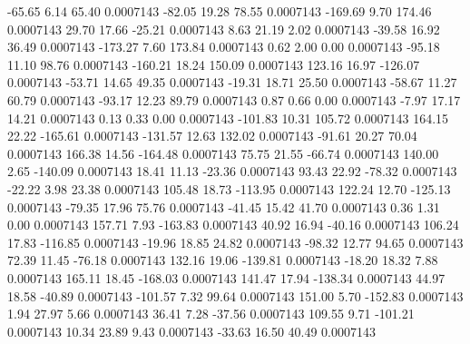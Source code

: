       -65.65        6.14       65.40     0.0007143
      -82.05       19.28       78.55     0.0007143
     -169.69        9.70      174.46     0.0007143
       29.70       17.66      -25.21     0.0007143
        8.63       21.19        2.02     0.0007143
      -39.58       16.92       36.49     0.0007143
     -173.27        7.60      173.84     0.0007143
        0.62        2.00        0.00     0.0007143
      -95.18       11.10       98.76     0.0007143
     -160.21       18.24      150.09     0.0007143
      123.16       16.97     -126.07     0.0007143
      -53.71       14.65       49.35     0.0007143
      -19.31       18.71       25.50     0.0007143
      -58.67       11.27       60.79     0.0007143
      -93.17       12.23       89.79     0.0007143
        0.87        0.66        0.00     0.0007143
       -7.97       17.17       14.21     0.0007143
        0.13        0.33        0.00     0.0007143
     -101.83       10.31      105.72     0.0007143
      164.15       22.22     -165.61     0.0007143
     -131.57       12.63      132.02     0.0007143
      -91.61       20.27       70.04     0.0007143
      166.38       14.56     -164.48     0.0007143
       75.75       21.55      -66.74     0.0007143
      140.00        2.65     -140.09     0.0007143
       18.41       11.13      -23.36     0.0007143
       93.43       22.92      -78.32     0.0007143
      -22.22        3.98       23.38     0.0007143
      105.48       18.73     -113.95     0.0007143
      122.24       12.70     -125.13     0.0007143
      -79.35       17.96       75.76     0.0007143
      -41.45       15.42       41.70     0.0007143
        0.36        1.31        0.00     0.0007143
      157.71        7.93     -163.83     0.0007143
       40.92       16.94      -40.16     0.0007143
      106.24       17.83     -116.85     0.0007143
      -19.96       18.85       24.82     0.0007143
      -98.32       12.77       94.65     0.0007143
       72.39       11.45      -76.18     0.0007143
      132.16       19.06     -139.81     0.0007143
      -18.20       18.32        7.88     0.0007143
      165.11       18.45     -168.03     0.0007143
      141.47       17.94     -138.34     0.0007143
       44.97       18.58      -40.89     0.0007143
     -101.57        7.32       99.64     0.0007143
      151.00        5.70     -152.83     0.0007143
        1.94       27.97        5.66     0.0007143
       36.41        7.28      -37.56     0.0007143
      109.55        9.71     -101.21     0.0007143
       10.34       23.89        9.43     0.0007143
      -33.63       16.50       40.49     0.0007143
